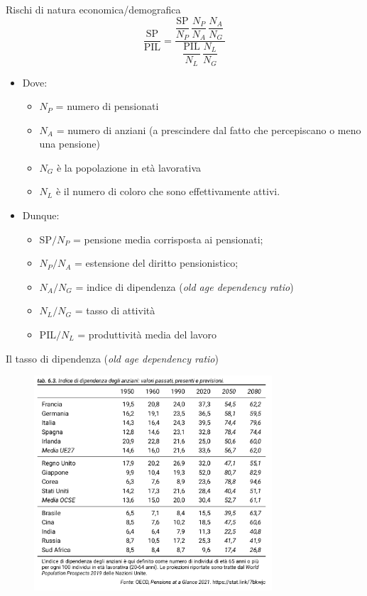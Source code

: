 \documentclass[aspectratio=64,12pt]{beamer}
\begin{document}
\begin{frame}{Rischi di natura economica/demografica}
\begin{equation*}
  \frac{\text{SP}}{\text{PIL}} =\frac{\dfrac{\text{SP}}{N_P}\,\dfrac{N_P}{N_A}\,\dfrac{N_A}{N_G}\,}
  {\dfrac{\text{PIL}}{N_L}\,\dfrac{N_L}{N_G}}
\end{equation*}

\begin{resize}{.9}
\begin{itemize}
\item Dove:
\begin{itemize}
\item $N_P$ = numero di pensionati
\item $N_A$ = numero di anziani (a prescindere dal fatto che percepiscano o meno una pensione)
\item $N_G$ è la popolazione in età lavorativa
\item $N_L$ è il numero di coloro che sono effettivamente attivi.
\end{itemize}
\item Dunque:
\begin{itemize}
\item SP$/N_P$ = pensione media corrisposta ai pensionati;
\item $N_P/N_A$ = estensione del diritto pensionistico;
\item $N_A/N_G$ = indice di dipendenza (\emph{old age dependency ratio})
\item $N_L/N_G$ = tasso di attività
\item $\text{PIL}/N_L$ = produttività media del lavoro
\end{itemize}
\end{itemize}
\end{resize}
\end{frame}


\begin{frame}{Il tasso di dipendenza  (\emph{old age dependency ratio})}
\begin{figure}[htbp]
\centering
\includegraphics[height=8cm]{./figure/old-age-dependency-ratio.png}
\end{figure}
\end{frame}
\end{document}
